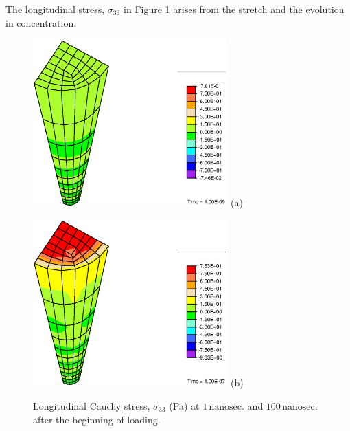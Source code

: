 The longitudinal stress, $\sigma_{33}$ in Figure \ref{stressfig}
arises from the stretch and the evolution in concentration.
\begin{figure}[!hpt]
\begin{minipage}[t]{7.5cm}
{\includegraphics[width=7.5cm]{images/examples/lagrangian/preliminary/S33-1}} \hskip 3cm (a) 
\end{minipage}
\begin{minipage}[t]{7.5cm}
{\includegraphics[width=7.5cm]{images/examples/lagrangian/preliminary/S33-100}} \hskip 3cm (b)
\end{minipage}
\caption{Longitudinal Cauchy stress, $\sigma_{33}$ (Pa) at $1
\,\mathrm{nanosec.}$ and $100\,\mathrm{nanosec.}$ after the
beginning of loading.} \label{stressfig}
\end{figure}

